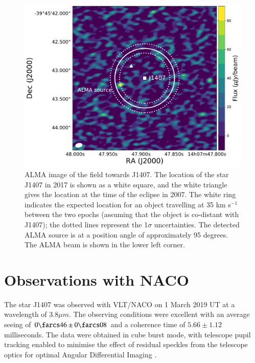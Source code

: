 \documentclass{aa} %
\newcommand{\kms}{km s$^{-1}$}
\begin{document}
\begin{figure}[tbh]
\begin{center}
\includegraphics[width=\columnwidth]{j1407_alma_gaia_astrometry_plot}
\caption{\label{fig:alma}ALMA image of the field towards J1407. The location of the star J1407 in 2017 is shown as a white square, and the white triangle gives the location at the time of the eclipse in 2007. The white ring indicates the expected location for an object travelling at 35 \kms{} between the two epochs (assuming that the object is co-distant with J1407);  the dotted lines represent the 1$\sigma$ uncertainties. The detected ALMA source is at a position angle of approximately 95 degrees. The ALMA beam is shown in the lower left corner.}
\end{center}
\end{figure}

\section{Observations with NACO\label{naco}} %

The star J1407 was observed with VLT/NACO \citep{Lenzen03,Rousset03} on 1 March 2019 UT at a wavelength of $3.8\mu m$.
%
The observing conditions were excellent with an average seeing of $0\farcs46\pm0\farcs08$ and a coherence time of $5.66\pm1.12$ milliseconds.
%
The data were obtained in cube burst mode, with telescope pupil tracking \citep{Kasper09} enabled to minimise the effect of residual speckles from the telescope optics for optimal Angular Differential Imaging \citep[ADI;][]{Marois06}.
\end{document}
